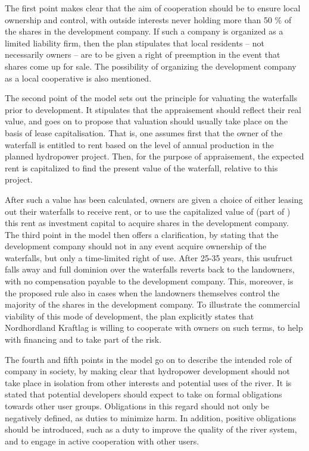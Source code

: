 The first point makes clear that the aim of cooperation should be to ensure local ownership and control, with outside interests never holding more than 50 \% of the shares in the development company. If such a company is organized as a limited liability firm, then the plan stipulates that local residents -- not necessarily owners -- are to be given a right of preemption in the event that shares come up for sale. The possibility of organizing the development company as a local cooperative is also mentioned. 

The second point of the model sets out the principle for valuating the waterfalls prior to development. It stipulates that the appraisement should reflect their real value, and goes on to propose that valuation should usually take place on the basis of lease capitalisation. That is, one assumes first that the owner of the waterfall is entitled to rent based on the level of annual production in the planned hydropower project. Then, for the purpose of appraisement, the expected rent is capitalized to find the present value of the waterfall, relative to this project.

After such a value has been calculated, owners are given a choice of either leasing out their waterfalls to receive rent, or to use the capitalized value of (part of ) this rent as investment capital to acquire shares in the development company. The third point in the model then offers a clarification, by stating that the development company should not in any event acquire ownership of the waterfalls, but only a time-limited right of use. After 25-35 years, this usufruct falls away and full dominion over the waterfalls reverts back to the landowners, with no compensation payable to the development company. This, moreover, is the proposed rule also in cases when the landowners themselves control the majority of the shares in the development company. To illustrate the commercial viability of this mode of development, the plan explicitly states that Nordhordland Kraftlag is willing to cooperate with owners on such terms, to help with financing and to take part of the risk. 

The fourth and fifth points in the model go on to describe the intended role of company in society, by making clear that hydropower development should not take place in isolation from other interests and potential uses of the river. It is stated that potential developers should expect to take on formal obligations towards other user groups. Obligations in this regard should not only be negatively defined, as duties to minimize harm. In addition, positive obligations should be introduced, such as a duty to improve the quality of the river system, and to engage in active cooperation with other users. 

